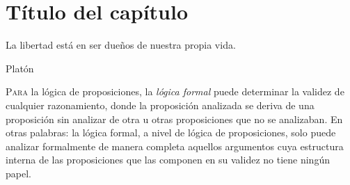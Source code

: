 \chapter{Título del capítulo}\label{cap:03}
\pagecolor{white}
\BgThispage
\thispagestyle{empty}
\pagestyle{isfodosuCD}
\epigraph{La libertad está en ser dueños de nuestra propia vida.}{Platón}

\lettrine[lraise=0, lines=4, loversize=0]{\textcolor{azulF}{P}}{ara} la lógica de proposiciones, la \textit{lógica 
formal} puede determinar la validez de cualquier razonamiento, donde la proposición analizada se deriva de una 
proposición sin analizar de otra u otras proposiciones que no se analizaban. En otras palabras: la lógica formal, a 
nivel de lógica de proposiciones, solo puede analizar formalmente de manera completa aquellos argumentos cuya estructura 
interna de las proposiciones que las componen en su validez no tiene ningún papel.

{}
\pagestyle{probprop}
\pagecolor{paginaprob}
